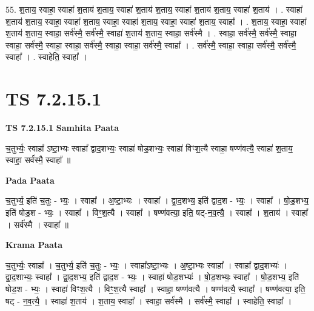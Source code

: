 \documentclass[17pt]{extarticle}
\begin{document}
55. श॒ताय॒ स्वाहा॒ स्वाहा॑ श॒ताय॑ श॒ताय॒ स्वाहा॑ श॒ताय॑ श॒ताय॒ स्वाहा॑ श॒ताय॑ श॒ताय॒ स्वाहा॑ श॒ताय॑ । . स्वाहा॑ श॒ताय॑ श॒ताय॒ स्वाहा॒ स्वाहा॑ श॒ताय॒ स्वाहा॒ स्वाहा॑ श॒ताय॒ स्वाहा॒ स्वाहा॑ श॒ताय॒ स्वाहा᳚ । . श॒ताय॒ स्वाहा॒ स्वाहा॑ श॒ताय॑ श॒ताय॒ स्वाहा॒ सर्व॑स्मै॒ सर्व॑स्मै॒ स्वाहा॑ श॒ताय॑ श॒ताय॒ स्वाहा॒ सर्व॑स्मै । . स्वाहा॒ सर्व॑स्मै॒ सर्व॑स्मै॒ स्वाहा॒ स्वाहा॒ सर्व॑स्मै॒ स्वाहा॒ स्वाहा॒ सर्व॑स्मै॒ स्वाहा॒ स्वाहा॒ सर्व॑स्मै॒ स्वाहा᳚ । . सर्व॑स्मै॒ स्वाहा॒ स्वाहा॒ सर्व॑स्मै॒ सर्व॑स्मै॒ स्वाहा᳚ । . स्वाहेति॒ स्वाहा᳚ । \newline
\pagebreak
{}

\section{ TS 7.2.15.1 }

\textbf{TS 7.2.15.1 } \newline
\textbf{Samhita Paata} \newline

च॒तुर्भ्यः॒ स्वाहा᳚ ऽष्टा॒भ्यः स्वाहा᳚ द्वाद॒शभ्यः॒ स्वाहा॑ षोड॒शभ्यः॒ स्वाहा॑ विꣳश॒त्यै स्वाहा॒ षण्ण॑वत्यै॒ स्वाहा॑ श॒ताय॒ स्वाहा॒ सर्व॑स्मै॒ स्वाहा᳚ ॥ \newline

\textbf{Pada Paata} \newline

च॒तुर्भ्य॒ इति॑ च॒तुः - भ्यः॒ । स्वाहा᳚ । अ॒ष्टा॒भ्यः । स्वाहा᳚ । द्वा॒द॒शभ्य॒ इति॑ द्वाद॒श - भ्यः॒ । स्वाहा᳚ । षो॒ड॒शभ्य॒ इति॑ षोड॒श - भ्यः॒ । स्वाहा᳚ । विꣳ॒॒श॒त्यै । स्वाहा᳚ । षण्ण॑वत्या॒ इति॒ षट्-न॒व॒त्यै॒ । स्वाहा᳚ । श॒ताय॑ । स्वाहा᳚ । सर्व॑स्मै । स्वाहा᳚ ॥  \newline


\textbf{Krama Paata} \newline

च॒तुर्भ्यः॒ स्वाहा᳚ । च॒तुर्भ्य॒ इति॑ च॒तुः - भ्यः॒ । स्वाहा᳚ऽष्टा॒भ्यः । अ॒ष्टा॒भ्यः स्वाहा᳚ । स्वाहा᳚ द्वाद॒शभ्यः॑ । द्वा॒द॒शाभ्यः॒ स्वाहा᳚ । द्वा॒द॒शभ्य॒ इति॑ द्वाद॒श - भ्यः॒ । स्वाहा॑ षोड॒शभ्यः॑ । षो॒ड॒शभ्यः॒ स्वाहा᳚ । षो॒ड॒शभ्य॒ इति॑ षोड॒श - भ्यः॒ । स्वाहा॑ विꣳश॒त्यै । विꣳ॒॒श॒त्यै स्वाहा᳚ । स्वाहा॒ षण्ण॑वत्यै । षण्ण॑वत्यै॒ स्वाहा᳚ । षण्ण॑वत्या॒ इति॒ षट् - न॒व॒त्यै॒ । स्वाहा॑ श॒ताय॑ । श॒ताय॒ स्वाहा᳚ । स्वाहा॒ सर्व॑स्मै । सर्व॑स्मै॒ स्वाहा᳚ । स्वाहेति॒ स्वाहा᳚ । \newline
\end{document}
